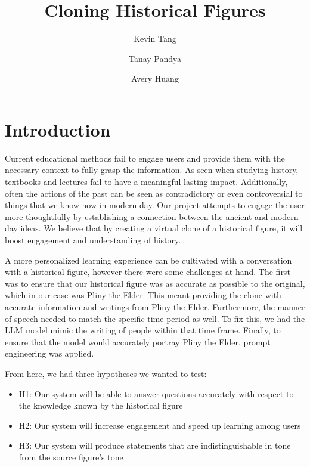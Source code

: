 \documentclass[sigconf]{aamas}
\title{Cloning Historical Figures}
\author{Kevin Tang}
\affiliation{
  \institution{Northeastern University}
  \city{Boston}
  \country{United States}}
\author{Tanay Pandya}
\affiliation{
  \institution{Northeastern University}
  \city{Boston}
  \country{United States}}
\author{Avery Huang}
\affiliation{
  \institution{Northeastern University}
  \city{Boston}
  \country{United States}}
\begin{document}

\pagestyle{fancy}
\fancyhead{}


\maketitle 


\section{Introduction}

Current educational methods fail to engage users and provide them with the necessary context to fully grasp the information. As seen when studying history, textbooks and lectures fail to have a meaningful lasting impact. Additionally, often the actions of the past can be seen as contradictory or even controversial to things that we know now in modern day. Our project attempts to engage the user more thoughtfully by establishing a connection between the ancient and modern day ideas. We believe that by creating a virtual clone of a historical figure, it will boost engagement and understanding of history.

A more personalized learning experience can be cultivated with a conversation with a historical figure, however there were some challenges at hand. The first was to ensure that our historical figure was as accurate as possible to the original, which in our case was Pliny the Elder. This meant providing the clone with accurate information and writings from Pliny the Elder. Furthermore, the manner of speech needed to match the specific time period as well. To fix this, we had the LLM model mimic the writing of people within that time frame. Finally, to ensure that the model would accurately portray Pliny the Elder, prompt engineering was applied.

From here, we had three hypotheses we wanted to test:

\begin{itemize}
    \item H1: Our system will be able to answer questions accurately with respect to the knowledge known by the historical figure
    \item H2: Our system will increase engagement and speed up learning among users
    \item H3: Our system will produce statements that are indistinguishable in tone from the source figure’s tone
\end{itemize}
    
\end{document}
